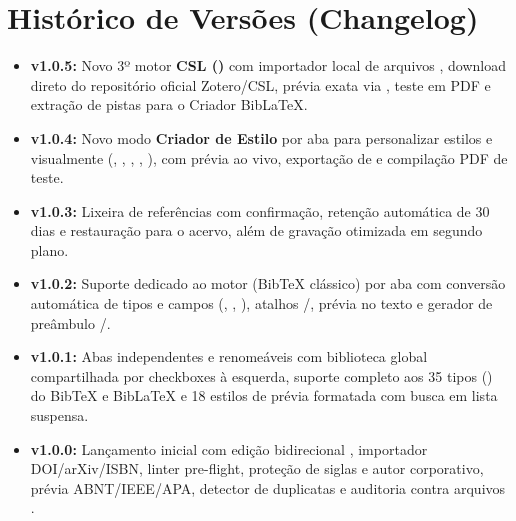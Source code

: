 \documentclass[11pt,a4paper]{article}
\begin{document}
\section{Histórico de Versões (Changelog)}
\begin{itemize}
  \item \textbf{v1.0.5:} Novo 3º motor \textbf{CSL ()} com importador local de arquivos , download direto do repositório oficial Zotero/CSL, prévia exata via , teste em PDF e extração de pistas  para o Criador BibLaTeX.
  \item \textbf{v1.0.4:} Novo modo \textbf{Criador de Estilo} por aba para personalizar estilos  e  visualmente (, , , , ), com prévia ao vivo, exportação de  e compilação PDF de teste.
  \item \textbf{v1.0.3:} Lixeira de referências com confirmação, retenção automática de 30 dias e restauração para o acervo, além de gravação otimizada em segundo plano.
  \item \textbf{v1.0.2:} Suporte dedicado ao motor  (BibTeX clássico) por aba com conversão automática de tipos e campos (, , ), atalhos /, prévia no texto e gerador de preâmbulo /.
  \item \textbf{v1.0.1:} Abas independentes e renomeáveis com biblioteca global compartilhada por checkboxes à esquerda, suporte completo aos 35 tipos () do BibTeX e BibLaTeX e 18 estilos de prévia formatada com busca em lista suspensa.
  \item \textbf{v1.0.0:} Lançamento inicial com edição bidirecional , importador DOI/arXiv/ISBN, linter pre-flight, proteção de siglas e autor corporativo, prévia ABNT/IEEE/APA, detector de duplicatas e auditoria contra arquivos .
\end{itemize}
\end{document}
